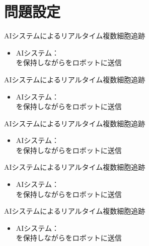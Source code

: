 \section{問題設定}


\begin{frame}{AIシステムによるリアルタイム複数細胞追跡}
    \begin{itemize}
        \item AIシステム：
        \\\ra {}を保持しながらをロボットに送信
    \end{itemize}
\end{frame}
\begin{frame}[noframenumbering]{AIシステムによるリアルタイム複数細胞追跡}
    \begin{itemize}
        \item AIシステム：
        \\\ra {}を保持しながらをロボットに送信
    \end{itemize}
\end{frame}
\begin{frame}[noframenumbering]{AIシステムによるリアルタイム複数細胞追跡}
    \begin{itemize}
        \item AIシステム：
        \\\ra {}を保持しながらをロボットに送信
    \end{itemize}
\end{frame}
\begin{frame}[noframenumbering]{AIシステムによるリアルタイム複数細胞追跡}
    \begin{itemize}
        \item AIシステム：
        \\\ra {}を保持しながらをロボットに送信
    \end{itemize}
\end{frame}
\begin{frame}[noframenumbering]{AIシステムによるリアルタイム複数細胞追跡}
    \begin{itemize}
        \item AIシステム：
        \\\ra {}を保持しながらをロボットに送信
    \end{itemize}
\end{frame}

